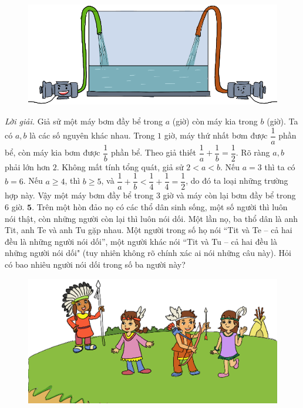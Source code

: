 \begin{multicols}{2}
\begin{figure}[H]
		\vspace*{-5pt}
		\centering
		\captionsetup{labelformat= empty, justification=centering}
		\includegraphics[width= 0.9\linewidth]{b4}
		\vspace*{-10pt}
	\end{figure}
	\textit{Lời giải.} 	Giả sử một máy bơm đầy bể trong $a$ (giờ) còn máy kia trong $b$ (giờ). Ta có $a,b$ là các số nguyên khác nhau. Trong $1$ giờ, máy thứ nhất bơm được $\dfrac{1}{a}$ phần bể, còn máy kia bơm được $\dfrac{1}{b}$ phần bể. Theo giả thiết $\dfrac{1}{a}+\dfrac{1}{b}= \dfrac{1}{2}$.
	\vskip 0.1cm
	Rõ ràng $a,b$ phải lớn hơn $2$. Không mất tính tổng quát, giả sử $2<a<b$. 
	\vskip 0.1cm
	Nếu $a = 3$ thì ta có $b = 6$.
	\vskip 0.1cm
	Nếu $a \ge 4$, thì $b \ge 5$, và $\dfrac{1}{a} + \dfrac{1}{b} < \dfrac{1}{4} + \dfrac{1}{4} = \dfrac{1}{2}$, do đó ta loại những trường hợp này.
	\vskip 0.1cm
	Vậy một máy bơm đầy bể trong $3$ giờ và máy còn lại bơm đầy bể trong $6$ giờ.
	\vskip 0.1cm
 	$\pmb{5.}$ Trên một hòn đảo nọ có các thổ dân sinh sống, một số người thì luôn nói thật, còn những người còn lại thì luôn nói dối. Một lần nọ, ba thổ dân là anh Tit, anh Te và anh Tu gặp nhau. Một người trong số họ nói ``Tit và Te -- cả hai đều là những  người nói dối'', một người khác nói ``Tit và Tu -- cả hai đều là những người nói dối" (tuy nhiên không rõ chính xác ai nói những câu này). Hỏi có bao nhiêu người nói dối trong số ba người này?
	\begin{figure}[H]
		\vspace*{-5pt}
		\centering
		\captionsetup{labelformat= empty, justification=centering}
		\includegraphics[width= 1\linewidth]{b5}

\end{figure}
\end{multicols}
